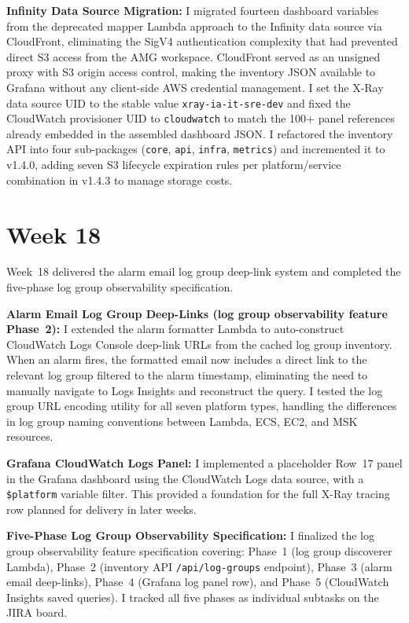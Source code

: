 \textbf{Infinity Data Source Migration:} 
I migrated fourteen dashboard variables from the deprecated mapper Lambda approach to the Infinity
data source via CloudFront, eliminating the SigV4 authentication complexity
that had prevented direct S3 access from the AMG workspace. CloudFront
served as an unsigned proxy with S3 origin access control, making the
inventory JSON available to Grafana without any client-side AWS credential
management. I set the X-Ray data source UID to the stable value
\texttt{xray-ia-it-sre-dev} and fixed the CloudWatch provisioner UID to
\texttt{cloudwatch} to match the 100+ panel references already embedded in
the assembled dashboard JSON. I refactored the inventory API into four
sub-packages (\texttt{core}, \texttt{api}, \texttt{infra}, \texttt{metrics})
and incremented it to v1.4.0, adding seven S3 lifecycle expiration rules
per platform/service combination in v1.4.3 to manage storage costs.


\FloatBarrier

\section{Week 18}
\label{sec:week18}

Week~18 delivered the alarm email log group deep-link system and completed
the five-phase log group observability specification.

\textbf{Alarm Email Log Group Deep-Links (log group observability feature Phase~2):} 
I extended the alarm
formatter Lambda to auto-construct CloudWatch Logs Console
deep-link URLs from the cached log group inventory. When an alarm fires,
the formatted email now includes a direct link to the relevant log group
filtered to the alarm timestamp, eliminating the need to manually navigate
to Logs Insights and reconstruct the query. I tested the log group URL encoding
utility for all seven platform types, handling the differences
in log group naming conventions between Lambda, ECS, EC2, and MSK resources.

\textbf{Grafana CloudWatch Logs Panel:} 
I implemented a placeholder Row~17 panel in the Grafana dashboard
using the CloudWatch Logs data source,
with a \texttt{\$platform} variable filter. This provided a foundation
for the full X-Ray tracing row planned for delivery in later weeks.

\textbf{Five-Phase Log Group Observability Specification:} 
I finalized the
log group observability feature specification covering: Phase~1 (log group discoverer
Lambda), Phase~2 (inventory API \texttt{/api/log-groups} endpoint), Phase~3
(alarm email deep-links), Phase~4 (Grafana log panel row), and Phase~5
(CloudWatch Insights saved queries). I tracked all five phases as individual subtasks on the JIRA board.

